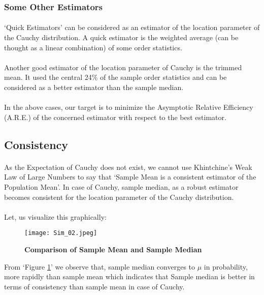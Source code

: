\documentclass[12pt, fleqn, a4paper]{article}
\begin{document}
	\subsubsection*{Some Other Estimators}
	\paragraph{} `Quick Estimators' can be considered as an estimator of the location parameter of the Cauchy distribution. A quick estimator is the weighted average (can be thought as a linear combination) of some order statistics. 
	\paragraph{} Another good estimator of the location parameter of Cauchy is the trimmed mean. It used the central 24\% of the sample order statistics and can be considered as a better estimator than the sample median. 
	\paragraph{} In the above cases, our target is to minimize the Asymptotic Relative Efficiency (A.R.E.) of the concerned estimator with respect to the best estimator. 
	
	\newpage	
	\subsection{Consistency}
	\paragraph{} As the Expectation of Cauchy does not exist, we cannot use Khintchine's Weak Law of Large Numbers to say that `Sample Mean is a consistent estimator of the Population Mean'. In case of Cauchy, sample median, as a robust estimator becomes consistent for the location parameter of the Cauchy distribution. 
	\paragraph{} Let, us visualize this graphically:
	\begin{figure}[H] \centering
		\texttt{[image: Sim\_02.jpeg]}
		\caption{\textbf{Comparison of Sample Mean and Sample Median}}
		\label{con}
	\end{figure}
	From `Figure \ref{con}' we observe that, sample median converges to $ \mu $ in probability, more rapidly than sample mean which indicates that Sample median is better in terms of consistency than sample mean in case of Cauchy. 
\end{document}
